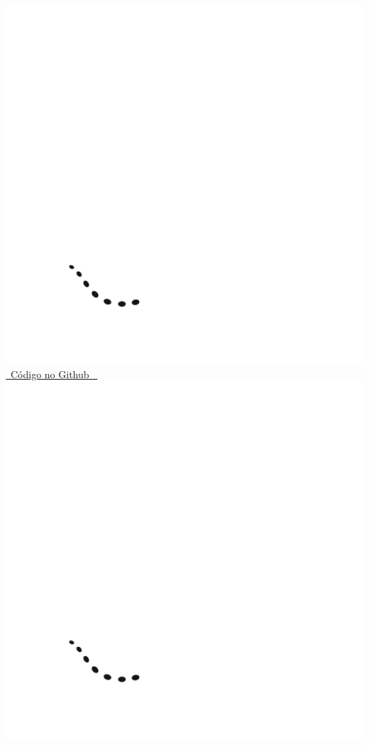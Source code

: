 \documentclass[a4paper,11pt,oneside]{book}
\theoremstyle{definition}
\theoremstyle{break}
\begin{document}
\begin{center}
\href{https://github.com/brunoruas2/Meus_Estudos/blob/main/Microeconomia/Microeconomics\%20-\%20Hal\%20Varian/models/cap25.2-demanda_linear_e_monopolio.py}{\includegraphics[scale=0.03]{_github_logo.png} \ Código no Github \ \includegraphics[scale=0.03]{_github_logo.png}}

\end{center}
\end{document}
